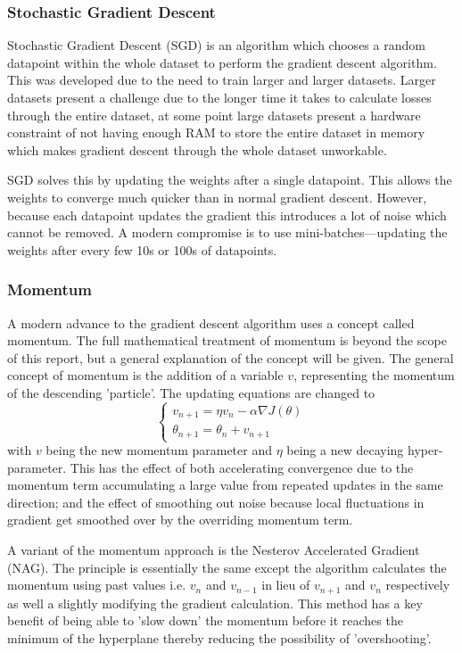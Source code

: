 \documentclass[a4paper,fleqn,usenatbib]{mnras}
\begin{document}
\subsubsection{Stochastic Gradient Descent}
Stochastic Gradient Descent (SGD) is an algorithm which chooses a random datapoint within the whole dataset to perform the gradient descent algorithm. This was developed due to the need to train larger and larger datasets. Larger datasets present a challenge due to the longer time it takes to calculate losses through the entire dataset, at some point large datasets present a hardware constraint of not having enough RAM to store the entire dataset in memory which makes gradient descent through the whole dataset unworkable. 

SGD solves this by updating the weights after a single datapoint. This allows the weights to converge much quicker than in normal gradient descent. However, because each datapoint updates the gradient this introduces a lot of noise which cannot be removed. A modern compromise is to use mini-batches---updating the weights after every few 10s or 100s of datapoints. \cite{SGD}

\subsubsection{Momentum}
A modern advance to the gradient descent algorithm uses a concept called momentum. The full mathematical treatment of momentum is beyond the scope of this report, but a general explanation of the concept will be given. \cite{Momentum} The general concept of momentum is the addition of a variable $v$, representing the momentum of the descending 'particle'. The updating equations are changed to 
\begin{equation}
\begin{cases} v_{n+1}=\eta v_{n}-\alpha\nabla J(\theta)  \\ \theta_{n+1}=\theta_{n}+v_{n+1}\end{cases}
\end{equation}
with $v$ being the new momentum parameter and $\eta$ being a new decaying hyper-parameter. This has the effect of both accelerating convergence due to the momentum term accumulating a large value from repeated updates in the same direction; and the effect of smoothing out noise because local fluctuations in gradient get smoothed over by the overriding momentum term.

A variant of the momentum approach is the Nesterov Accelerated Gradient (NAG). The principle is essentially the same except the algorithm calculates the momentum using past values i.e. $v_{n}$ and $v_{n-1}$ in lieu of $v_{n+1}$ and $v_{n}$ respectively as well a slightly modifying the gradient calculation. This method has a key benefit of being able to 'slow down' the momentum before it reaches the minimum of the hyperplane thereby reducing the possibility of 'overshooting'.
\end{document}

